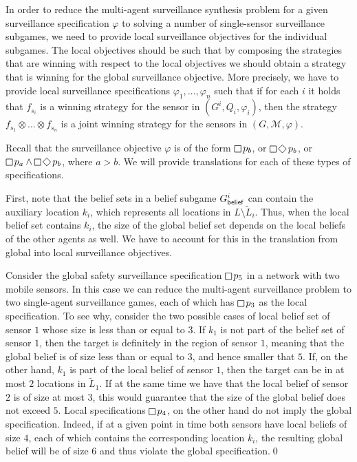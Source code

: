 In order to reduce the multi-agent surveillance synthesis problem for a given surveillance specification $\varphi$ to solving a number of single-sensor surveillance subgames, we need to provide local surveillance objectives for the individual subgames. The local objectives should be such that by composing the strategies that are winning with respect to the local objectives we should obtain a strategy that is winning for the global surveillance objective. More precisely, we have to provide local surveillance specifications $\varphi_1,\ldots,\varphi_n$ such that if for each $i$ it holds that $f_{s_i}$ is  a winning strategy for the sensor in $(G^i,Q_i,\varphi_i)$, then the strategy $f_{s_1}\otimes \ldots \otimes f_{s_n}$ is  a joint winning strategy for the sensors in $(G,\mathcal M,\varphi)$.

Recall that the surveillance objective $\varphi$ is of the form $\LTLglobally p_b$, or $\LTLglobally\LTLfinally p_b$, or $\LTLglobally p_a \wedge \LTLglobally\LTLfinally p_b$, where $a > b$. We will provide translations for each of these types of  specifications.

First, note that the belief sets in a belief subgame $G^i_{\mathsf{belief}}$ can contain the auxiliary location $k_i$, which represents all locations in $L \setminus \widetilde L_i$. Thus, when the local belief set contains $k_i$, the size of the global belief set depends on the local beliefs of the other agents as well. We have to account for this in the translation from global into local surveillance objectives.

\begin{example}\label{ex:global-local-safety}
Consider the global safety surveillance specification $\LTLglobally p_5$ in a network with two mobile sensors. In this case we can reduce the multi-agent surveillance problem to two single-agent surveillance games, each of which has $\LTLglobally p_3$ as the local specification. 
To see why, consider the two possible cases of local belief set of sensor $1$ whose size is less than or equal to $3$. If $k_1$ is not part of the belief set of sensor $1$, then the target is definitely in the region of sensor $1$, meaning that the global belief is of size less than or equal to $3$, and hence smaller that $5$. If, on the other hand, $k_1$ is part of the local belief of sensor $1$, then the target can be in at most $2$ locations in $\widetilde L_1$. If at the same time we have that the local belief of sensor $2$ is of size at most $3$, this would guarantee that the size of the global belief does not exceed $5$. 
Local specifications $\LTLglobally p_4$, on the other hand do not imply the global specification. Indeed, if at a given point in time both sensors have local beliefs of size $4$, each of which contains the corresponding location $k_i$, the resulting global belief will be of size $6$ and thus violate the global specification.\qed
\end{example}

